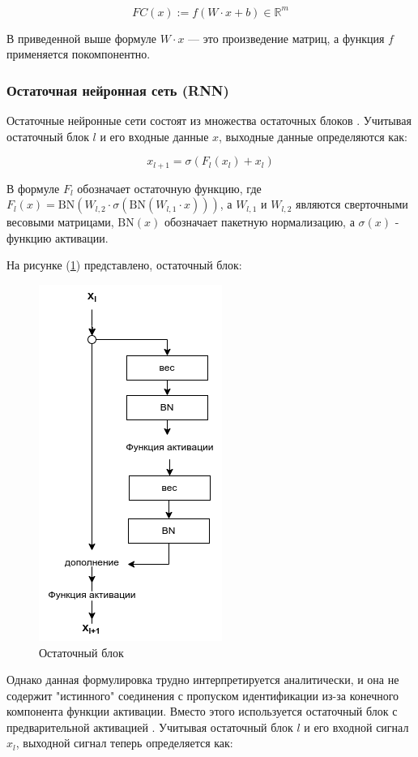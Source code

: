 \[
    FC(x) := f(W \cdot x + b) \in \mathbb{R}^{m}
\]

В приведенной выше формуле \(W \cdot x\) — это произведение матриц, а функция \(f\) применяется покомпонентно.

\subsubsection{Остаточная нейронная сеть (RNN)}

Остаточные нейронные сети состоят из множества остаточных блоков \cite{he2016deep}. Учитывая остаточный блок \(l\) и его входные данные \(x\), выходные данные определяются как:

\[
    x_{l + 1} = \sigma(F_{l}(x_{l}) + x_{l})
\]

В формуле \(F_{l}\) обозначает остаточную функцию, где \(F_{l}(x) = \text{BN}(W_{l,2} \cdot \sigma(\text{BN}(W_{l,1} \cdot x)))\), а \(W_{l,1}\) и \(W_{l,2}\) являются сверточными весовыми матрицами, \(\text{BN}(x)\) обозначает пакетную нормализацию, а \(\sigma(x)\) - функцию активации.

На рисунке (\ref{fig:residual-block}) представлено, остаточный блок: 
\begin{figure}[H]
	\centering
	\includegraphics[width=0.3\linewidth]{images/residual-block.png}
	\caption{Остаточный блок}
	\label{fig:residual-block}
\end{figure}

Однако данная формулировка трудно интерпретируется аналитически, и она не содержит "истинного" соединения с пропуском идентификации из-за конечного компонента функции активации. Вместо этого используется остаточный блок с предварительной активацией \cite{he2016identity}. Учитывая остаточный блок \(l\) и его входной сигнал \(x_{l}\), выходной сигнал теперь определяется как:

